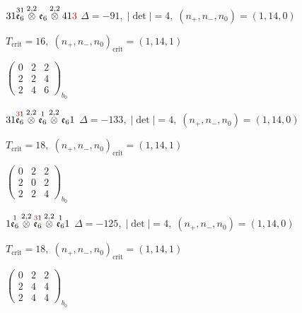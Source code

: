 \documentclass[10pt]{article}
\begin{document}
\smallskip

$31\overset{31}{\mathfrak{e}_6}\overset{2,2}{\otimes}\mathfrak{e}_6\overset{2,2}{\otimes}41\textcolor{red}{3}$ \quad $\Delta=-91,\; |\det|=4,\; (n_+,n_-,n_0)=(1,14,0)$

\hspace{1em}$T_{\text{crit}}=16,\; (n_+,n_-,n_0)_{\text{crit}}=(1,14,1)$

\hspace{2em}$\left(\begin{smallmatrix}0 & 2 & 2 \\ 2 & 2 & 4 \\ 2 & 4 & 6\end{smallmatrix}\right)_{\!b_0}$

\smallskip

$31\overset{\textcolor{red}{3}1}{\mathfrak{e}_6}\overset{2,2}{\otimes}\overset{1}{\mathfrak{e}_6}\overset{2,2}{\otimes}\mathfrak{e}_61$ \quad $\Delta=-133,\; |\det|=4,\; (n_+,n_-,n_0)=(1,14,0)$

\hspace{1em}$T_{\text{crit}}=18,\; (n_+,n_-,n_0)_{\text{crit}}=(1,14,1)$

\hspace{2em}$\left(\begin{smallmatrix}0 & 2 & 2 \\ 2 & 0 & 2 \\ 2 & 2 & 4\end{smallmatrix}\right)_{\!b_0}$

\smallskip

$1\overset{1}{\mathfrak{e}_6}\overset{2,2}{\otimes}\overset{\textcolor{red}{3}1}{\mathfrak{e}_6}\overset{2,2}{\otimes}\overset{1}{\mathfrak{e}_6}1$ \quad $\Delta=-125,\; |\det|=4,\; (n_+,n_-,n_0)=(1,14,0)$

\hspace{1em}$T_{\text{crit}}=18,\; (n_+,n_-,n_0)_{\text{crit}}=(1,14,1)$

\hspace{2em}$\left(\begin{smallmatrix}0 & 2 & 2 \\ 2 & 4 & 4 \\ 2 & 4 & 4\end{smallmatrix}\right)_{\!b_0}$
\end{document}
